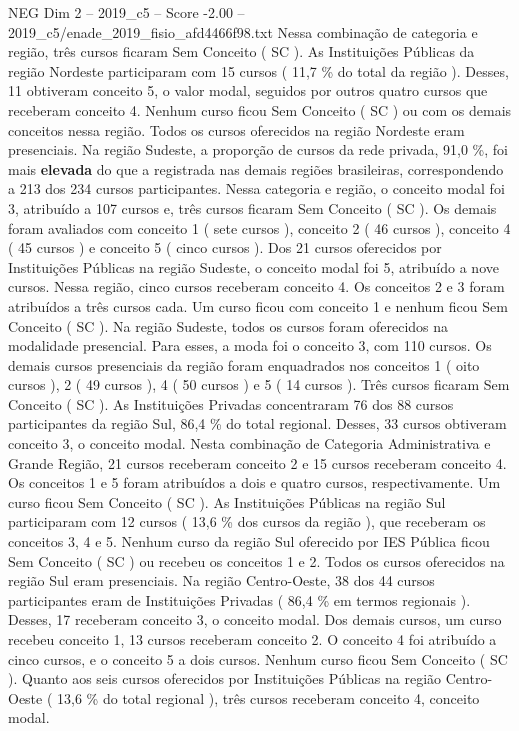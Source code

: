 \begin{textsample}{NEG Dim 2 – 2019\_c5 – Score -2.00 – 2019\_c5/enade\_2019\_fisio\_afd4466f98.txt}
Nessa combinação de categoria e região, três cursos ficaram Sem Conceito ( SC ).
As Instituições Públicas da região Nordeste participaram com 15 cursos ( 11,7 \% do total da região ).
Desses, 11 obtiveram conceito 5, o valor modal, seguidos por outros quatro cursos que receberam conceito 4.
Nenhum curso ficou Sem Conceito ( SC ) ou com os demais conceitos nessa região.
Todos os cursos oferecidos na região Nordeste eram presenciais.
Na região Sudeste, a proporção de cursos da rede privada, 91,0 \%, foi mais \textbf{elevada} do que a registrada nas demais regiões brasileiras, correspondendo a 213 dos 234 cursos participantes.
Nessa categoria e região, o conceito modal foi 3, atribuído a 107 cursos e, três cursos ficaram Sem Conceito ( SC ).
Os demais foram avaliados com conceito 1 ( sete cursos ), conceito 2 ( 46 cursos ), conceito 4 ( 45 cursos ) e conceito 5 ( cinco cursos ).
Dos 21 cursos oferecidos por Instituições Públicas na região Sudeste, o conceito modal foi 5, atribuído a nove cursos.
Nessa região, cinco cursos receberam conceito 4.
Os conceitos 2 e 3 foram atribuídos a três cursos cada.
Um curso ficou com conceito 1 e nenhum ficou Sem Conceito ( SC ).
Na região Sudeste, todos os cursos foram oferecidos na modalidade presencial.
Para esses, a moda foi o conceito 3, com 110 cursos.
Os demais cursos presenciais da região foram enquadrados nos conceitos 1 ( oito cursos ), 2 ( 49 cursos ), 4 ( 50 cursos ) e 5 ( 14 cursos ).
Três cursos ficaram Sem Conceito ( SC ).
As Instituições Privadas concentraram 76 dos 88 cursos participantes da região Sul, 86,4 \% do total regional.
Desses, 33 cursos obtiveram conceito 3, o conceito modal.
Nesta combinação de Categoria Administrativa e Grande Região, 21 cursos receberam conceito 2 e 15 cursos receberam conceito 4.
Os conceitos 1 e 5 foram atribuídos a dois e quatro cursos, respectivamente.
Um curso ficou Sem Conceito ( SC ).
As Instituições Públicas na região Sul participaram com 12 cursos ( 13,6 \% dos cursos da região ), que receberam os conceitos 3, 4 e 5.
Nenhum curso da região Sul oferecido por IES Pública ficou Sem Conceito ( SC ) ou recebeu os conceitos 1 e 2.
Todos os cursos oferecidos na região Sul eram presenciais.
Na região Centro-Oeste, 38 dos 44 cursos participantes eram de Instituições Privadas ( 86,4 \% em termos regionais ).
Desses, 17 receberam conceito 3, o conceito modal.
Dos demais cursos, um curso recebeu conceito 1, 13 cursos receberam conceito 2.
O conceito 4 foi atribuído a cinco cursos, e o conceito 5 a dois cursos.
Nenhum curso ficou Sem Conceito ( SC ).
Quanto aos seis cursos oferecidos por Instituições Públicas na região Centro-Oeste ( 13,6 \% do total regional ), três cursos receberam conceito 4, conceito modal.

\end{textsample}
